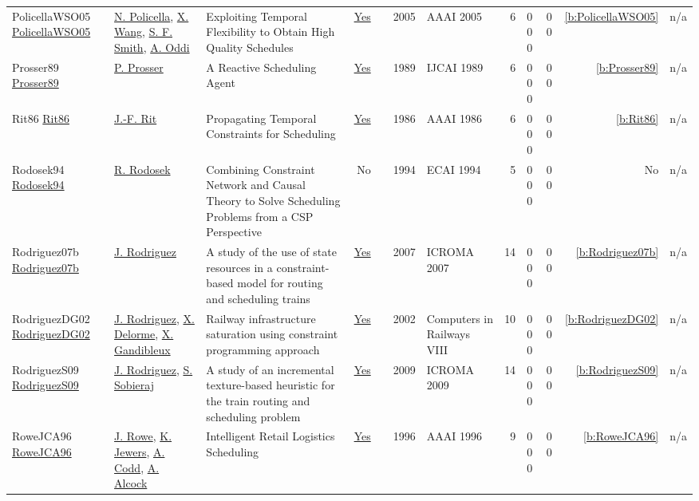 {\begin{longtable}{>{\raggedright\arraybackslash}p{3cm}>{\raggedright\arraybackslash}p{4.5cm}>{\raggedright\arraybackslash}p{6.0cm}rrrp{2.5cm}rp{1cm}p{1cm}rr}
PolicellaWSO05 \href{http://www.aaai.org/Library/AAAI/2005/aaai05-190.php}{PolicellaWSO05} & \hyperref[auth:a283]{N. Policella}, \hyperref[auth:a1341]{X. Wang}, \hyperref[auth:a298]{S. F. Smith}, \hyperref[auth:a282]{A. Oddi} & Exploiting Temporal Flexibility to Obtain High Quality Schedules & \href{../works/PolicellaWSO05.pdf}{Yes} & \cite{PolicellaWSO05} & 2005 & AAAI 2005 & 6 & 0 0 0 & 0 0 & \ref{b:PolicellaWSO05} & n/a\\
Prosser89 \href{http://ijcai.org/Proceedings/89-2/Papers/025.pdf}{Prosser89} & \hyperref[auth:a827]{P. Prosser} & A Reactive Scheduling Agent & \href{../works/Prosser89.pdf}{Yes} & \cite{Prosser89} & 1989 & IJCAI 1989 & 6 & 0 0 0 & 0 0 & \ref{b:Prosser89} & n/a\\
Rit86 \href{http://www.aaai.org/Library/AAAI/1986/aaai86-064.php}{Rit86} & \hyperref[auth:a1272]{J.-F. Rit} & Propagating Temporal Constraints for Scheduling & \href{../works/Rit86.pdf}{Yes} & \cite{Rit86} & 1986 & AAAI 1986 & 6 & 0 0 0 & 0 0 & \ref{b:Rit86} & n/a\\
Rodosek94 \href{}{Rodosek94} & \hyperref[auth:a297]{R. Rodosek} & Combining Constraint Network and Causal Theory to Solve Scheduling Problems from a {CSP} Perspective & No & \cite{Rodosek94} & 1994 & ECAI 1994 & 5 & 0 0 0 & 0 0 & No & n/a\\
Rodriguez07b \href{}{Rodriguez07b} & \hyperref[auth:a781]{J. Rodriguez} & A study of the use of state resources in a constraint-based model for routing and scheduling trains & \href{../works/Rodriguez07b.pdf}{Yes} & \cite{Rodriguez07b} & 2007 & ICROMA 2007 & 14 & 0 0 0 & 0 0 & \ref{b:Rodriguez07b} & n/a\\
RodriguezDG02 \href{}{RodriguezDG02} & \hyperref[auth:a781]{J. Rodriguez}, \hyperref[auth:a782]{X. Delorme}, \hyperref[auth:a783]{X. Gandibleux} & Railway infrastructure saturation using constraint programming approach & \href{../works/RodriguezDG02.pdf}{Yes} & \cite{RodriguezDG02} & 2002 & Computers in Railways VIII & 10 & 0 0 0 & 0 0 & \ref{b:RodriguezDG02} & n/a\\
RodriguezS09 \href{}{RodriguezS09} & \hyperref[auth:a781]{J. Rodriguez}, \hyperref[auth:a1018]{S. Sobieraj} & A study of an incremental texture-based heuristic for the train routing and scheduling problem & \href{../works/RodriguezS09.pdf}{Yes} & \cite{RodriguezS09} & 2009 & ICROMA 2009 & 14 & 0 0 0 & 0 0 & \ref{b:RodriguezS09} & n/a\\
RoweJCA96 \href{http://www.aaai.org/Library/IAAI/1996/iaai96-280.php}{RoweJCA96} & \hyperref[auth:a1284]{J. Rowe}, \hyperref[auth:a1285]{K. Jewers}, \hyperref[auth:a1286]{A. Codd}, \hyperref[auth:a1287]{A. Alcock} & Intelligent Retail Logistics Scheduling & \href{../works/RoweJCA96.pdf}{Yes} & \cite{RoweJCA96} & 1996 & AAAI 1996 & 9 & 0 0 0 & 0 0 & \ref{b:RoweJCA96} & n/a\\

\end{longtable}}
